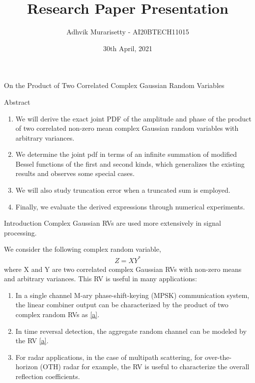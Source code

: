 \documentclass{beamer}
\title{Research Paper Presentation}
\author{Adhvik Murarisetty - AI20BTECH11015}
\date{30th April, 2021}
\begin{document}
\begin{frame}
\titlepage
\end{frame}

\section{}
\begin{frame}{On the Product of Two Correlated Complex
Gaussian Random Variables}
\begin{block}{Abstract}
\begin{enumerate}
    \item We will derive the exact joint PDF of the amplitude and phase of the product of two correlated non-zero mean complex Gaussian random variables with arbitrary variances.
    \item We determine the joint pdf in terms of an infinite summation of modified Bessel functions of the first and second kinds, which generalizes the existing results and observes some special cases. 
    \item We will also study truncation error when a truncated sum is employed.
    \item Finally, we evaluate the derived expressions through numerical experiments.
\end{enumerate}
\end{block}
\end{frame}

\begin{frame}
\begin{block}{Introduction}
Complex Gaussian RVs are used more extensively in signal processing.

We consider the following complex random variable,
\begin{align}
    Z=X Y^*\label{a}
\end{align}
where X and Y are two correlated complex Gaussian RVs
with non-zero means and arbitrary variances. This RV is useful in many applications: 
\begin{enumerate}
    \item In a single channel M-ary phase-shift-keying (MPSK) communication system, the linear combiner output can be characterized by the product of two complex random RVs as \eqref{a}.
    \item In time reversal detection, the aggregate random channel can be modeled by the RV \eqref{a}.
    \item For radar applications, in the case of multipath scattering, for over-the-horizon (OTH) radar for example, the RV is useful to characterize the overall reflection coefficients.
\end{enumerate}
\end{block}
\end{frame}
\end{document}
